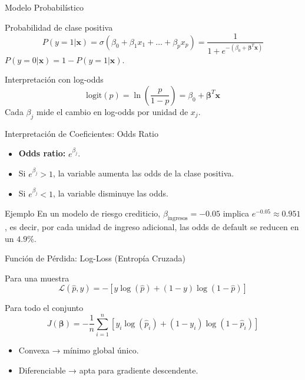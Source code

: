 \documentclass[aspectratio=169, 10pt, xcolor=table]{beamer}
\begin{document}
\begin{frame}{Modelo Probabilístico}
    \begin{block}{Probabilidad de clase positiva}
        \[
        P(y=1|\mathbf{x}) = \sigma(\beta_0 + \beta_1 x_1 + \dots + \beta_p x_p) = \frac{1}{1 + e^{-(\beta_0 + \boldsymbol{\beta}^T \mathbf{x})}}
        \]
        $P(y=0|\mathbf{x}) = 1 - P(y=1|\mathbf{x})$.
    \end{block}
    \begin{exampleblock}{Interpretación con log-odds}
        \[
        \text{logit}(p) = \ln\left(\frac{p}{1-p}\right) = \beta_0 + \boldsymbol{\beta}^T \mathbf{x}
        \]
        Cada $\beta_j$ mide el cambio en log-odds por unidad de $x_j$.
    \end{exampleblock}
\end{frame}

\begin{frame}{Interpretación de Coeficientes: Odds Ratio}
    \begin{itemize}
        \item \textbf{Odds ratio:} $e^{\beta_j}$.
        \item Si $e^{\beta_j} > 1$, la variable aumenta las odds de la clase positiva.
        \item Si $e^{\beta_j} < 1$, la variable disminuye las odds.
    \end{itemize}
    \begin{exampleblock}{Ejemplo}
        En un modelo de riesgo crediticio, $\beta_{\text{ingresos}} = -0.05$ implica $e^{-0.05} \approx 0.951$, es decir, por cada unidad de ingreso adicional, las odds de default se reducen en un $4.9\%$.
    \end{exampleblock}
\end{frame}

\begin{frame}{Función de Pérdida: Log-Loss (Entropía Cruzada)}
    \begin{block}{Para una muestra}
        \[
        \mathcal{L}(\hat{p}, y) = -[y \log(\hat{p}) + (1-y) \log(1-\hat{p})]
        \]
    \end{block}
    \begin{block}{Para todo el conjunto}
        \[
        J(\boldsymbol{\beta}) = -\frac{1}{n} \sum_{i=1}^n \left[ y_i \log(\hat{p}_i) + (1-y_i) \log(1-\hat{p}_i) \right]
        \]
        \begin{itemize}
            \item Convexa → mínimo global único.
            \item Diferenciable → apta para gradiente descendente.
        \end{itemize}
    \end{block}
\end{frame}
\end{document}
